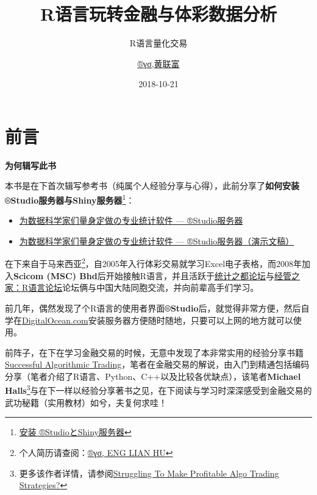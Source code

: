 \documentclass[]{book}
\title{R语言玩转金融与体彩数据分析}
\subtitle{R语言量化交易}
\author{\href{https://beta.rstudioconnect.com/content/3091/ryo-eng.html}{®γσ,黄联富}}
\date{2018-10-21}
\providecommand{\tightlist}{%
  \setlength{\itemsep}{0pt}\setlength{\parskip}{0pt}}
\let\rmarkdownfootnote\footnote%
\def\footnote{\protect\rmarkdownfootnote}
\begin{document}
\maketitle

{
\setcounter{tocdepth}{1}
\tableofcontents
}
\chapter{前言}\label{preface}

\textbf{为何辑写此书}

本书是在下首次辑写参考书（纯属个人经验分享与心得），此前分享了\textbf{如何安装®Studio服务器与Shiny服务器}\footnote{\href{https://github.com/scibrokes/setup-rstudio-server}{安装
  ®StudioとShiny服务器}}：

\begin{itemize}
\tightlist
\item
  \href{https://beta.rstudioconnect.com/englianhu/Introducing-RStudio-Server-for-Data-Scientists/Introducing-RStudio-Server-for-Data-Scientists.html}{为数据科学家们量身定做の专业统计软件
  --- ®Studio服务器}
\item
  \href{https://beta.rstudioconnect.com/englianhu/Introducing-RStudio-Server-for-Data-Scientists-Slides/Introducing-RStudio-Server-for-Data-Scientists-slides.html}{为数据科学家们量身定做の专业统计软件
  --- ®Studio服务器（演示文稿）}
\end{itemize}

在下来自于马来西亚\footnote{个人简历请查阅：\href{https://beta.rstudioconnect.com/content/3091/ryo-eng.html}{®γσ,
  ENG LIAN HU}}，自2005年入行体彩交易就学习Excel电子表格，而2008年加入\textbf{Scicom
(MSC)
Bhd}后开始接触R语言，并且活跃于\href{https://d.cosx.org}{统计之都论坛}与\href{http://bbs.pinggu.org/forum-69-1.html}{经管之家：R语言论坛}论坛俩与中国大陆同胞交流，并向前辈高手们学习。

前几年，偶然发现了个R语言的使用者界面\textbf{®Studio}后，就觉得非常方便，然后自学在\href{https://m.do.co/c/aabb124120d0}{DigitalOcean.com}安装服务器方便随时随地，只要可以上网的地方就可以使用。

前阵子，在下在学习金融交易的时候，无意中发现了本非常实用的经验分享书籍\href{https://raw.githubusercontent.com/englianhu/binary.com-interview-question/master/reference/Successful\%20Algorithmic\%20Trading.pdf}{Successful
Algorithmic
Trading}，笔者在金融交易的解说，由入门到精通包括编码分享（笔者介绍了R语言、Python、C++以及比较各优缺点），该笔者\textbf{Michael
Halls}\footnote{更多该作者详情，请参阅\href{https://www.quantstart.com/successful-algorithmic-trading-ebook}{Struggling
  To Make Profitable Algo Trading Strategies?}}与在下一样以经验分享著书之见，在下阅读与学习时深深感受到金融交易的武功秘籍（实用教材）如兮，夫复何求哇！
\end{document}
